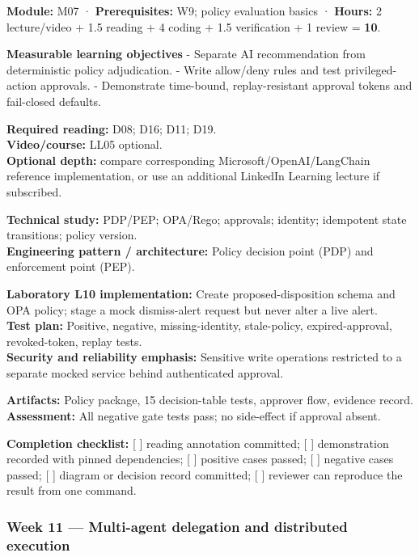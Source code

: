\documentclass[
  10pt,
]{article}
\begin{document}
\textbf{Module:} M07 · \textbf{Prerequisites:} W9; policy evaluation
basics · \textbf{Hours:} 2 lecture/video + 1.5 reading + 4 coding + 1.5
verification + 1 review = \textbf{10}.

\textbf{Measurable learning objectives} - Separate AI recommendation
from deterministic policy adjudication. - Write allow/deny rules and
test privileged-action approvals. - Demonstrate time-bound,
replay-resistant approval tokens and fail-closed defaults.

\textbf{Required reading:} D08; D16; D11; D19.\\
\textbf{Video/course:} LL05 optional.\\
\textbf{Optional depth:} compare corresponding
Microsoft/OpenAI/LangChain reference implementation, or use an
additional LinkedIn Learning lecture if subscribed.

\textbf{Technical study:} PDP/PEP; OPA/Rego; approvals; identity;
idempotent state transitions; policy version.\\
\textbf{Engineering pattern / architecture:} Policy decision point (PDP)
and enforcement point (PEP).

\textbf{Laboratory L10 implementation:} Create proposed-disposition
schema and OPA policy; stage a mock dismiss-alert request but never
alter a live alert.\\
\textbf{Test plan:} Positive, negative, missing-identity, stale-policy,
expired-approval, revoked-token, replay tests.\\
\textbf{Security and reliability emphasis:} Sensitive write operations
restricted to a separate mocked service behind authenticated approval.

\textbf{Artifacts:} Policy package, 15 decision-table tests, approver
flow, evidence record.\\
\textbf{Assessment:} All negative gate tests pass; no side-effect if
approval absent.

\textbf{Completion checklist:} {[} {]} reading annotation committed; {[}
{]} demonstration recorded with pinned dependencies; {[} {]} positive
cases passed; {[} {]} negative cases passed; {[} {]} diagram or decision
record committed; {[} {]} reviewer can reproduce the result from one
command.

\subsubsection{Week 11 --- Multi-agent delegation and distributed
execution}\label{week-11-multi-agent-delegation-and-distributed-execution}
\end{document}
